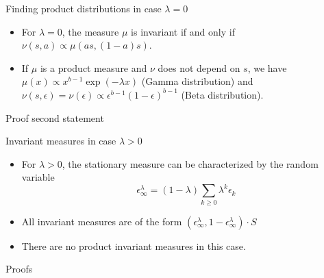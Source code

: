 \documentclass[9pt, handout]{beamer}
\begin{document}
\begin{frame}{Finding product distributions in case $\lambda = 0$}
\begin{itemize}
    \item For $\lambda = 0$, the measure $\mu$ is invariant if and only if $\nu(s, a) \propto \mu(as, (1-a)s)$.
    \item If $\mu$ is a product measure and $\nu$ does not depend on $s$, we have $\mu(x) \propto x^{b-1} \exp(-\lambda x)$ (Gamma distribution) and $\nu(s, \epsilon) = \nu(\epsilon) \propto \epsilon^{b-1}(1-\epsilon)^{b-1}$ (Beta distribution).
\end{itemize}
\end{frame}


\begin{frame}{Proof second statement}
\end{frame}


\begin{frame}{Invariant measures in case $\lambda > 0$}
\begin{itemize}
    \item For $\lambda > 0$, the stationary measure can be characterized by the random variable
        \[
            \epsilon_{\infty}^{\lambda} = (1-\lambda)\sum_{k \ge 0} \lambda^k \epsilon_k
        \]
    \item All invariant measures are of the form $(\epsilon_{\infty}^{\lambda}, 1 - \epsilon_{\infty}^{\lambda}) \cdot S$
    \item There are no product invariant measures in this case.
\end{itemize}
\end{frame}


\begin{frame}{Proofs}
\end{frame}
\end{document}
